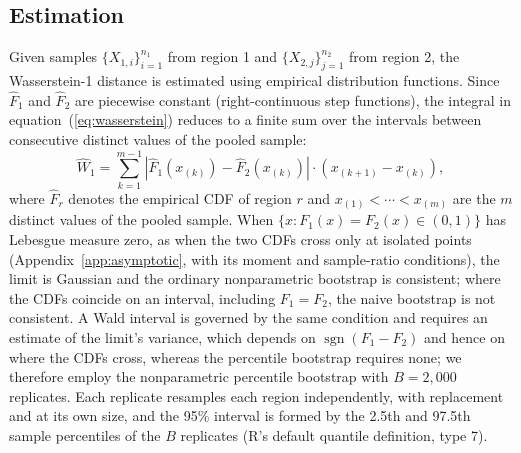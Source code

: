 \documentclass[AMA,Times1COL]{WileyNJDv5}
\begin{document}
\subsection{Estimation}\label{sec:estimation}

Given samples $\{X_{1,i}\}_{i=1}^{n_1}$ from region 1 and $\{X_{2,j}\}_{j=1}^{n_2}$ from region 2, the Wasserstein-1 distance is estimated using empirical distribution functions. Since $\hat{F}_1$ and $\hat{F}_2$ are piecewise constant (right-continuous step functions), the integral in equation~(\ref{eq:wasserstein}) reduces to a finite sum over the intervals between consecutive distinct values of the pooled sample:
\begin{equation}
\widehat{W}_1 = \sum_{k=1}^{m-1} |\hat{F}_1(x_{(k)}) - \hat{F}_2(x_{(k)})| \cdot (x_{(k+1)} - x_{(k)}),
\label{eq:estimator}
\end{equation}
where $\hat{F}_r$ denotes the empirical CDF of region $r$ and $x_{(1)} < \cdots < x_{(m)}$ are the $m$ distinct values of the pooled sample. When $\{x : F_1(x) = F_2(x) \in (0,1)\}$ has Lebesgue measure zero, as when the two CDFs cross only at isolated points (Appendix~\ref{app:asymptotic}, with its moment and sample-ratio conditions), the limit is Gaussian and the ordinary nonparametric bootstrap is consistent;\cite{fang2019} where the CDFs coincide on an interval, including $F_1 = F_2$, the naive bootstrap is not consistent.\cite{dumbgen1993} A Wald interval is governed by the same condition and requires an estimate of the limit's variance, which depends on $\operatorname{sgn}(F_1 - F_2)$ and hence on where the CDFs cross, whereas the percentile bootstrap requires none; we therefore employ the nonparametric percentile bootstrap\cite{efron1993} with $B = 2{,}000$ replicates. Each replicate resamples each region independently, with replacement and at its own size, and the 95\% interval is formed by the 2.5th and 97.5th sample percentiles of the $B$ replicates (R's default quantile definition, type 7).
\end{document}
